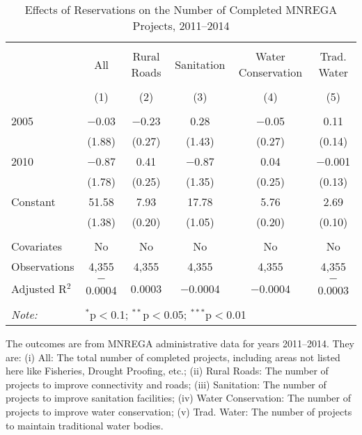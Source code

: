 \begin{table}[!htbp]
\centering
\begin{threeparttable}

  \caption{Effects of Reservations on the Number of Completed MNREGA Projects, 2011--2014} 
  \label{main_mnrega} 
\scriptsize 
\begin{tabular}{@{\extracolsep{0pt}}lccccc} 
\\[-1.8ex]\hline 
\hline \\[-1.8ex] 
 & All & Rural Roads & Sanitation & Water Conservation & Trad. Water \\ 
\\[-1.8ex] & (1) & (2) & (3) & (4) & (5)\\ 
\hline \\[-1.8ex] 
 2005 & $-$0.03 & $-$0.23 & 0.28 & $-$0.05 & 0.11 \\ 
  & (1.88) & (0.27) & (1.43) & (0.27) & (0.14) \\ 
  2010 & $-$0.87 & 0.41 & $-$0.87 & 0.04 & $-$0.001 \\ 
  & (1.78) & (0.25) & (1.35) & (0.25) & (0.13) \\ 
  Constant & 51.58 & 7.93 & 17.78 & 5.76 & 2.69 \\ 
  & (1.38) & (0.20) & (1.05) & (0.20) & (0.10) \\ 
 \hline \\[-1.8ex] 
Covariates & No & No & No & No & No \\ 
Observations & 4,355 & 4,355 & 4,355 & 4,355 & 4,355 \\ 
Adjusted R$^{2}$ & $-$0.0004 & 0.0003 & $-$0.0004 & $-$0.0004 & $-$0.0003 \\ 
\hline 
\hline \\[-1.8ex] 
\textit{Note:}  & \multicolumn{5}{l}{$^{*}$p$<$0.1; $^{**}$p$<$0.05; $^{***}$p$<$0.01} \\ 
\end{tabular} 
\begin{tablenotes}[flushleft]
\scriptsize
\item The outcomes are from MNREGA administrative data for years 2011--2014. They are: 
(i) All: The total number of completed projects, including areas not listed here like Fisheries, Drought Proofing, etc.;
(ii) Rural Roads: The number of projects to improve connectivity and roads;
(iii) Sanitation: The number of projects to improve sanitation facilities;
(iv) Water Conservation: The number of projects to improve water conservation;
(v) Trad. Water: The number of projects to maintain traditional water bodies.
\end{tablenotes}
\end{threeparttable}
\end{table}

